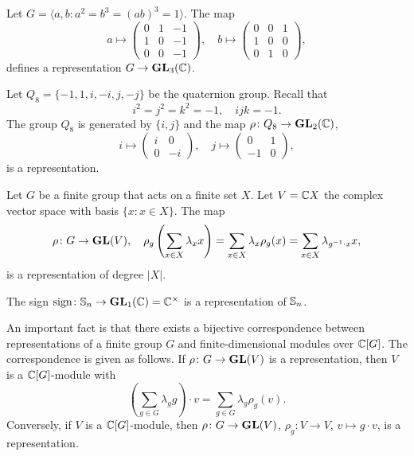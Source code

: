 \begin{example}
  Let $G=\langle a,b:a^2=b^3=(ab)^3=1\rangle$. The map 
  \[
    a\mapsto\begin{pmatrix}
    0 & 1 & -1\\
    1 & 0 & -1\\
    0 & 0 & -1
    \end{pmatrix},
    \quad
    b\mapsto\begin{pmatrix}
      0 & 0 & 1\\
      1 & 0 & 0\\
      0 & 1 & 0
    \end{pmatrix},
  \]
  defines a representation $G\to\mathbf{GL}_3(\mathbb{C})$. 
\end{example}

\begin{example}
    Let $Q_8=\{-1,1,i,-i,j,-j\}$ be the quaternion group. Recall that
    \[
    i^2=j^2=k^2=-1,\quad
    ijk=-1.
    \]
    The group $Q_8$ is generated by $\{i,j\}$ 
    and the map $\rho\colon Q_8\to\mathbf{GL}_2(\mathbb{C})$, 
    \[
    i\mapsto\begin{pmatrix}
    i&0\\0&-i
    \end{pmatrix},
    \quad
    j\mapsto\begin{pmatrix}
    0&1\\-1&0
    \end{pmatrix},
    \]
    is a representation.
\end{example}

\begin{example}
  Let $G$ be a finite group that acts on a finite set $X$. 
  Let $V=\mathbb{C} X$ the complex vector space with basis $\{x:x\in
  X\}$. The map 
  \[
	\rho\colon G\to\mathbf{GL}(V),\quad
	\rho_g\left(\sum_{x\in X}\lambda_x x\right)
	=\sum_{x\in X}\lambda_x\rho_g(x)
	=\sum_{x\in X}\lambda_{g^{-1}\cdot x}x, 
  \]
  is a representation of degree $|X|$.
\end{example}

\begin{example}
    The sign $\operatorname{sign}\colon\mathbb{S}_n\to\mathbf{GL}_1(\mathbb{C})=\mathbb{C}^{\times}$ is a representation of $\mathbb{S}_n$.
\end{example}

An important fact is that there exists a bijective
correspondence 
between 
representations of a finite group $G$ 
and 
finite-dimensional modules over $\mathbb{C}[G]$. The correspondence
is given as follows. If $\rho\colon G\to\mathbf{GL}(V)$ is a representation, 
then $V$ is a $\mathbb{C}[G]$-module with
\[
\left(\sum_{g\in G}\lambda_gg\right)\cdot v=\sum_{g\in G}\lambda_g\rho_g(v).
\]
Conversely, if $V$ is a $\mathbb{C}[G]$-module, then
$\rho\colon G\to\mathbf{GL}(V)$, $\rho_g\colon V\to V$, $v\mapsto g\cdot v$, 
is a representation. 

